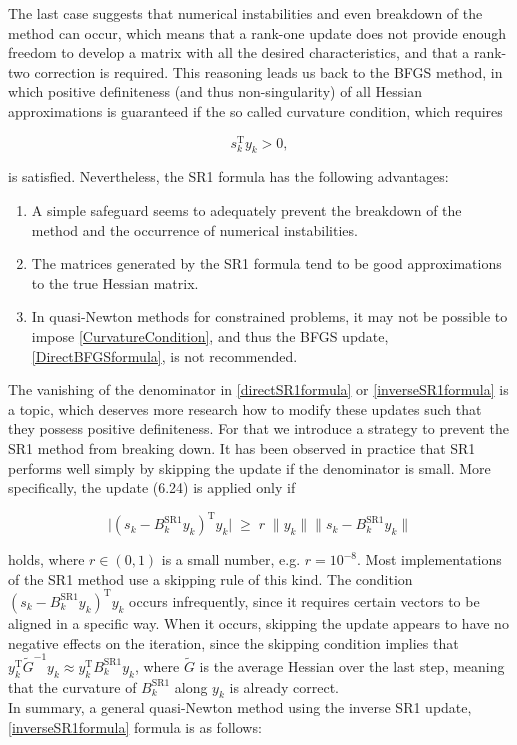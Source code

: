 The last case suggests that numerical instabilities and even breakdown of the method can occur, which means that a rank-one update does not provide enough freedom to develop a matrix with all the desired characteristics, and that a rank-two correction is required. This reasoning leads us back to the BFGS method, in which positive definiteness (and thus non-singularity) of all Hessian approximations is guaranteed if the so called curvature condition, which requires

\begin{equation}\label{CurvatureCondition}
    s^{\mathrm{T}}_k y_k > 0,
\end{equation}

is satisfied. Nevertheless, the SR1 formula has the following advantages:

\begin{enumerate}
    \item A simple safeguard seems to adequately prevent the breakdown of the method and the occurrence of numerical instabilities.
    \item The matrices generated by the SR1 formula tend to be good approximations to the true Hessian matrix.
    \item In quasi-Newton methods for constrained problems, it may not be possible to impose \cref{CurvatureCondition}, and thus the BFGS update, \cref{DirectBFGSformula}, is not recommended. 
\end{enumerate}


The vanishing of the denominator in \cref{directSR1formula} or \cref{inverseSR1formula} is a topic, which deserves more research how to modify these updates such that they possess positive definiteness. For that we introduce a strategy to prevent the SR1 method from breaking down. It has been observed in practice that SR1 performs well simply by skipping the update if the denominator is small. More specifically, the update (6.24) is applied only if 

\begin{equation}\label{CautiousSR1}
    \lvert (s_k - B^\mathrm{SR1}_k y_k)^{\mathrm{T}} y_k \lvert \; \geq \; r \; \lVert y_k \rVert \lVert s_k - B^\mathrm{SR1}_k y_k \rVert 
\end{equation}

holds, where $r \in (0, 1)$ is a small number, e.g. $r = 10^{−8}$. Most implementations of the SR1 method use a skipping rule of this kind. The condition $(s_k - B^\mathrm{SR1}_k y_k)^{\mathrm{T}} y_k$ occurs infrequently, since it requires certain vectors to be aligned in a specific way. When it occurs, skipping the update appears to have no negative effects on the iteration, since the skipping condition implies that $y^{\mathrm{T}}_k \tilde{G}^{-1} y_k \approx y^{\mathrm{T}}_k B^\mathrm{SR1}_k y_k$, where $\tilde{G}$ is the average Hessian over the last step, meaning that the curvature of $B^\mathrm{SR1}_k$ along $y_k$ is already correct. \\
In summary, a general quasi-Newton method using the inverse SR1 update, \cref{inverseSR1formula} formula is as follows:

